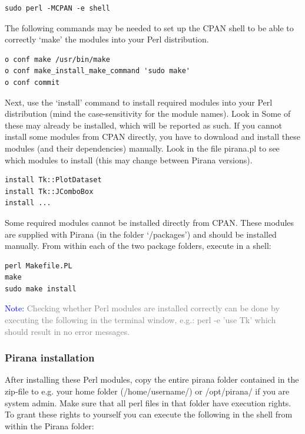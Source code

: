 \begin{lstlisting} 
sudo perl -MCPAN -e shell
\end{lstlisting}

\noindent The following commands may be needed to set up the CPAN
shell to be able to correctly `make' the modules into your Perl distribution.
\begin{lstlisting}
o conf make /usr/bin/make
o conf make_install_make_command 'sudo make'
o conf commit
\end{lstlisting}

\noindent Next, use the `install' command to install required modules
into your Perl distribution (mind the case-sensitivity for the module
names). Look in Some of these may already be installed, which will be reported
as such. If you cannot install some modules from CPAN directly, you
have to download and install these modules (and their
dependencies) manually. Look in the file pirana.pl to see which
modules to install (this may change between Pirana versions).

\begin{lstlisting}
install Tk::PlotDataset
install Tk::JComboBox
install ...
\end{lstlisting}

\noindent Some required modules cannot be installed directly from
CPAN. These modules are supplied with Pirana (in the folder
`/packages') and should be installed manually. From within each of the
two package folders, execute in a shell:

\begin{lstlisting}
perl Makefile.PL
make
sudo make install
\end{lstlisting}

\vspace{8pt}
\noindent\scriptsize{\textcolor{Blue}{Note:} \textcolor{Grey}{Checking
whether Perl modules are installed correctly can be done by executing the
following in the terminal window, e.g.: perl -e 'use Tk' which should
result in no error messages.\\ } } \normalsize

\subsubsection*{Pirana installation}
\noindent After installing these Perl modules, copy the entire pirana
folder contained in the zip-file to e.g. your home folder
(/home/username/) or /opt/pirana/ if you are system
admin. Make sure that all perl files in that folder have
execution rights. To grant these rights to yourself you can execute
the following in the shell from within the Pirana folder:

